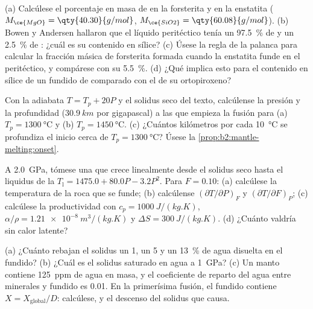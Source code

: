 \begin{exercise}[$\star\star$]\label{exo:b2:mantle-melting:6}
(a) Calcúlese el porcentaje en masa de  en la forsterita  y en la
enstatita  ($M_{\ce{MgO}} = \qty{40.30}{g/mol}$, $M_{\ce{SiO2}} =
\qty{60.08}{g/mol}$). (b) Bowen y Andersen hallaron que el líquido peritéctico tenía un
\qty{97.5}{\percent} de  y un \qty{2.5}{\percent} de : ¿cuál es su
contenido en sílice? (c) Úsese la regla de la palanca para calcular la fracción másica de forsterita
formada cuando la enstatita funde en el peritéctico, y compárese con su
\qty{5.5}{\percent}. (d) ¿Qué implica esto para el contenido en sílice de un fundido de
 comparado con el de su ortopiroxeno?
\end{exercise}

\begin{exercise}[$\star\star$]\label{exo:b2:mantle-melting:7}
Con la adiabata $T = T_p + 20P$ y el solidus seco del texto, calcúlense la
presión y la profundidad ($\qty{30.9}{km}$ por gigapascal) a las que empieza la fusión
para (a) $T_p = \qty{1300}{\celsius}$ y (b) $T_p = \qty{1450}{\celsius}$. (c) ¿Cuántos
kilómetros por cada \qty{10}{\celsius} se profundiza el inicio cerca de
$T_p = \qty{1300}{\celsius}$? Úsese la \cref{prop:b2:mantle-melting:onset}.
\end{exercise}

\begin{exercise}[$\star\star$]\label{exo:b2:mantle-melting:8}
A \qty{2.0}{GPa}, tómese una  que crece linealmente desde el solidus seco hasta
el liquidus de la  $T_{\mathrm l} = 1475.0 + 80.0P - 3.2P^2$. Para $F = 0.10$:
(a) calcúlese la temperatura de la roca que se funde; (b) calcúlense $(\partial
T/\partial P)_F$ y $(\partial T/\partial F)_P$; (c) calcúlese la productividad con
$c_p = \qty{1000}{J/(kg.K)}$, $\alpha/\rho = \qty{1.21e-8}{m^3/(kg.K)}$ y
$\Delta S = \qty{300}{J/(kg.K)}$. (d) ¿Cuánto valdría sin calor latente?
\end{exercise}

\begin{exercise}[$\star\star$]\label{exo:b2:mantle-melting:9}
(a) ¿Cuánto rebajan el solidus un 1, un 5 y un \qty{13}{\percent} de agua disuelta en el
fundido? (b) ¿Cuál es el solidus saturado en agua a \qty{1}{GPa}? (c) Un manto
contiene \qty{125}{ppm} de agua en masa, y el coeficiente de reparto del agua entre
minerales y fundido es 0.01. En la primerísima fusión, el fundido contiene $X =
X_{\text{global}}/D$: calcúlese, y el descenso del solidus que causa.
\end{exercise}

